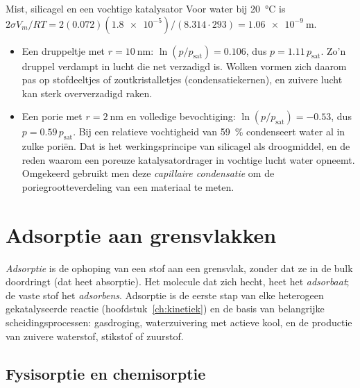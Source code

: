 \begin{voorbeeld}{Mist, silicagel en een vochtige katalysator}
Voor water bij \SI{20}{\celsius} is $2\sigma V_m/RT = 2(0.072)(\num{1.8e-5})/(8.314\cdot293) = \SI{1.06e-9}{\metre}$.
\begin{itemize}
\item Een druppeltje met $r = \SI{10}{\nano\metre}$: $\ln(p/p_\mathrm{sat}) = 0.106$, dus $p = 1.11\,p_\mathrm{sat}$. Zo'n druppel verdampt in lucht die net verzadigd is. Wolken vormen zich daarom pas op stofdeeltjes of zoutkristalletjes (condensatiekernen), en zuivere lucht kan sterk oververzadigd raken.
\item Een porie met $r = \SI{2}{\nano\metre}$ en volledige bevochtiging: $\ln(p/p_\mathrm{sat}) = -0.53$, dus $p = 0.59\,p_\mathrm{sat}$. Bij een relatieve vochtigheid van \SI{59}{\percent} condenseert water al in zulke poriën. Dat is het werkingsprincipe van silicagel als droogmiddel, en de reden waarom een poreuze katalysatordrager in vochtige lucht water opneemt. Omgekeerd gebruikt men deze \emph{capillaire condensatie} om de poriegrootteverdeling van een materiaal te meten.
\end{itemize}
\end{voorbeeld}

\section{Adsorptie aan grensvlakken}
\label{sec:adsorptie-grensvlakken}

\emph{Adsorptie} is de ophoping van een stof aan een grensvlak, zonder dat ze in de bulk doordringt (dat heet absorptie). Het molecule dat zich hecht, heet het \emph{adsorbaat}; de vaste stof het \emph{adsorbens}. Adsorptie is de eerste stap van elke heterogeen gekatalyseerde reactie (hoofdstuk~\ref{ch:kinetiek}) en de basis van belangrijke scheidingsprocessen: gasdroging, waterzuivering met actieve kool, en de productie van zuivere waterstof, stikstof of zuurstof.

\subsection{Fysisorptie en chemisorptie}
\label{sec:fysisorptie-chemisorptie}

